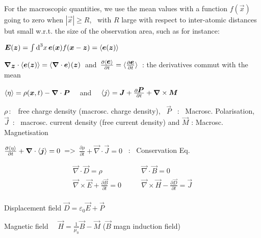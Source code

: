 \item[] For the macroscopic quantities, we use the mean values with a function $f(\vec{x})$ going to zero when $|\vec{x}| \geq R$, \, with $R$ large with respect to inter-atomic distances but small w.r.t. the size of the observation area, such as for instance:

\item $\mbox{\boldmath$E$}(\mbox{\boldmath$z$}) = \int \textrm{d} ^3x \, \mbox{\boldmath$e$}(\mbox{\boldmath$x$})f(\mbox{\boldmath$x$}-\mbox{\boldmath$z$}) =  \langle\mbox{\boldmath$e$}(\mbox{\boldmath$z$})\rangle$

\item $\mbox{\boldmath$\nabla$}_{\mbox{\boldmath$z$}} \cdot \langle\mbox{\boldmath$e$}(\mbox{\boldmath$z$})\rangle = \langle\mbox{\boldmath$\nabla$} \cdot \mbox{\boldmath$e$}\rangle(\mbox{\boldmath$z$}) \, $ and  $\, \frac{\partial \langle\mbox{\boldmath$e$}\rangle}{\partial t} = \langle\frac{\partial \mbox{\boldmath$e$}}{\partial t}\rangle \,$ : the derivatives commut with the mean

\item $\langle\eta\rangle = \rho(\mbox{\boldmath$x$},t) - \mbox{\boldmath$\nabla$}\cdot\mbox{\boldmath$P$} \quad$ and  $\quad \langle j\rangle = \mbox{\boldmath$J$} + \frac{\partial \mbox{\boldmath$P$}}{\partial t} + \mbox{\boldmath$\nabla$} \times \mbox{\boldmath$M$}$

\item $\rho \, :$ \, free charge density (macrosc. charge density), \, $\vec{P}$ \, : \, Macrosc. Polarisation, \, $\vec{J} \,$ : \, macrosc. current density (free current density) and $\vec{M}$ : Macrosc. Magnetisation

\item $\frac{\partial \langle\eta\rangle}{\partial t} + \mbox{\boldmath$\nabla$}\cdot\langle\mbox{\boldmath$j$}\rangle = 0 \,$ => $\, \frac{\partial \rho}{\partial t} + \vec{\nabla}\cdot\vec{J} = 0$ \, : \, Conservation Eq.
\squishend
{}
\squishlist

\item[] $$\boxed{\begin{split}
	\vec{\nabla}\cdot\vec{D} = \rho  \qquad &\vec{\nabla} \cdot \vec{B} = 0\\
	\vec{\nabla}\times \vec{E} + \frac{\partial\vec{B}}{\partial t} = 0 \qquad & \vec{\nabla} \times \vec{H} - \frac{\partial \vec{D}}{\partial t} = \vec{J}\\
	\end{split}}$$
\item Displacement field $\vec{D}=\varepsilon_0\vec{E}+\vec{P} \quad $

\item Magnetic field $\quad \vec{H}=\frac{1}{\mu_0}\vec{B}-\vec{M}$ ($\vec{B}$ magn induction field)

